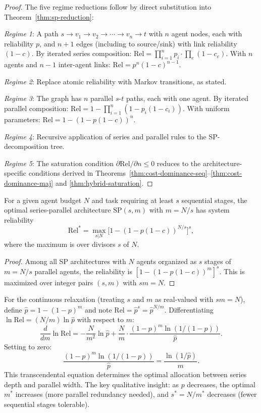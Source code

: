 \begin{proof}
The five regime reductions follow by direct substitution into
Theorem~\ref{thm:sp-reduction}:

\emph{Regime 1}: A path $s \to v_1 \to v_2 \to \cdots \to v_n \to t$ with $n$
agent nodes, each with reliability $p$, and $n+1$ edges (including to source/sink)
with link reliability $(1-c)$. By iterated series composition:
$\mathrm{Rel} = \prod_{i=1}^n p_i \cdot \prod_{e} (1-c_e)$. With $n$ agents and
$n-1$ inter-agent links: $\mathrm{Rel} = p^n(1-c)^{n-1}$.

\emph{Regime 2}: Replace atomic reliability with Markov transitions, as stated.

\emph{Regime 3}: The graph has $n$ parallel $s$-$t$ paths, each with one agent.
By iterated parallel composition: $\mathrm{Rel} = 1 - \prod_{i=1}^n(1-p_i(1-c_i))$.
With uniform parameters: $\mathrm{Rel} = 1-(1-p(1-c))^n$.

\emph{Regime 4}: Recursive application of series and parallel rules to the
SP-decomposition tree.

\emph{Regime 5}: The saturation condition $\partial\mathrm{Rel}/\partial n \leq 0$
reduces to the architecture-specific conditions derived in
Theorems~\ref{thm:cost-dominance-seq}--\ref{thm:cost-dominance-maj} and
\ref{thm:hybrid-saturation}.
\end{proof}

\begin{corollary}
\label{cor:unified-optimal}
For a given agent budget $N$ and task requiring at least $s$ sequential stages, the
optimal series-parallel architecture $\mathrm{SP}(s, m)$ with $m = N/s$ has system
reliability
\[
  \mathrm{Rel}^* = \max_{s | N} \bigl[1 - (1-p(1-c))^{N/s}\bigr]^s,
\]
where the maximum is over divisors $s$ of $N$.
\end{corollary}

\begin{proof}
Among all SP architectures with $N$ agents organized as $s$ stages of $m = N/s$
parallel agents, the reliability is $[1-(1-p(1-c))^m]^s$. This is maximized over
integer pairs $(s,m)$ with $sm = N$.
\end{proof}

\begin{remark}
\label{rmk:series-parallel-tradeoff}
For the continuous relaxation (treating $s$ and $m$ as real-valued with $sm = N$),
define $\hat{p} = 1 - (1-p)^m$ and note $\mathrm{Rel} = \hat{p}^s =
\hat{p}^{N/m}$. Differentiating $\ln\mathrm{Rel} = (N/m)\ln\hat{p}$ with respect
to $m$:
\[
  \frac{d}{dm}\ln\mathrm{Rel} = -\frac{N}{m^2}\ln\hat{p}
    + \frac{N}{m} \cdot \frac{(1-p)^m\ln(1/(1-p))}{\hat{p}}.
\]
Setting to zero:
\[
  \frac{(1-p)^m \ln(1/(1-p))}{\hat{p}} = \frac{\ln(1/\hat{p})}{m}.
\]
This transcendental equation determines the optimal allocation between series depth
and parallel width. The key qualitative insight: as $p$ decreases, the optimal $m^*$
increases (more parallel redundancy needed), and $s^* = N/m^*$ decreases (fewer
sequential stages tolerable).
\end{remark}

